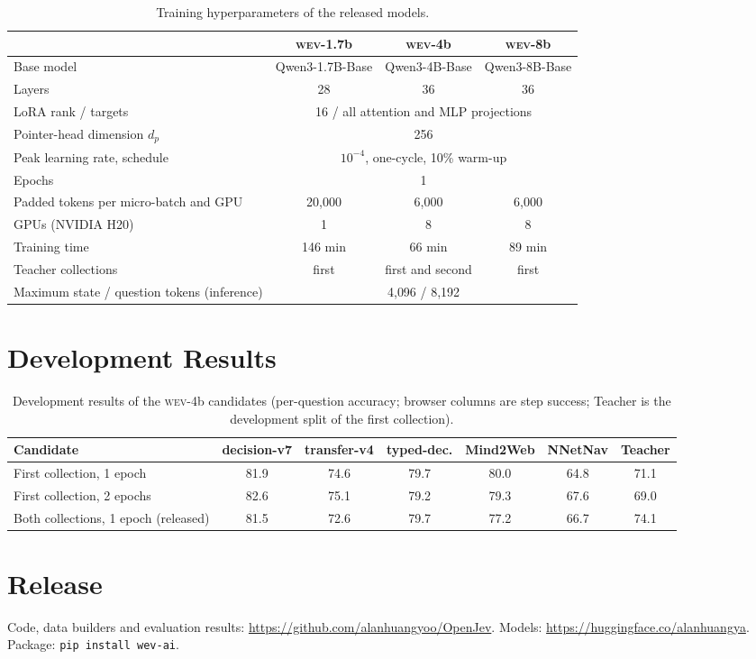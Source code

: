 \documentclass{article}
\newcommand{\wev}{\textsc{wev}\xspace}
\begin{document}
\begin{table}[h]
\centering
\caption{Training hyperparameters of the released models.}
\small
\begin{tabular}{lccc}
\toprule
 & \wev-1.7b & \wev-4b & \wev-8b \\
\midrule
Base model & Qwen3-1.7B-Base & Qwen3-4B-Base & Qwen3-8B-Base \\
Layers & 28 & 36 & 36 \\
LoRA rank / targets & \multicolumn{3}{c}{16 / all attention and MLP projections} \\
Pointer-head dimension $d_p$ & \multicolumn{3}{c}{256} \\
Peak learning rate, schedule & \multicolumn{3}{c}{$10^{-4}$, one-cycle, 10\% warm-up} \\
Epochs & \multicolumn{3}{c}{1} \\
Padded tokens per micro-batch and GPU & 20{,}000 & 6{,}000 & 6{,}000 \\
GPUs (NVIDIA H20) & 1 & 8 & 8 \\
Training time & 146 min & 66 min & 89 min \\
Teacher collections & first & first and second & first \\
Maximum state / question tokens (inference) & \multicolumn{3}{c}{4{,}096 / 8{,}192} \\
\bottomrule
\end{tabular}
\end{table}

\section{Development Results}
\label{app:dev}

\begin{table}[h]
\centering
\caption{Development results of the \wev-4b candidates (per-question accuracy; browser columns are step success;
Teacher is the development split of the first collection).}
\small
\begin{tabular}{lcccccc}
\toprule
Candidate & decision-v7 & transfer-v4 & typed-dec. & Mind2Web & NNetNav & Teacher \\
\midrule
First collection, 1 epoch & 81.9 & 74.6 & 79.7 & 80.0 & 64.8 & 71.1 \\
First collection, 2 epochs & 82.6 & 75.1 & 79.2 & 79.3 & 67.6 & 69.0 \\
Both collections, 1 epoch (released) & 81.5 & 72.6 & 79.7 & 77.2 & 66.7 & 74.1 \\
\bottomrule
\end{tabular}
\end{table}

\section{Release}
\label{app:release}

Code, data builders and evaluation results: \url{https://github.com/alanhuangyoo/OpenJev}. Models:
\url{https://huggingface.co/alanhuangya}. Package: \texttt{pip install wev-ai}.
\end{document}
